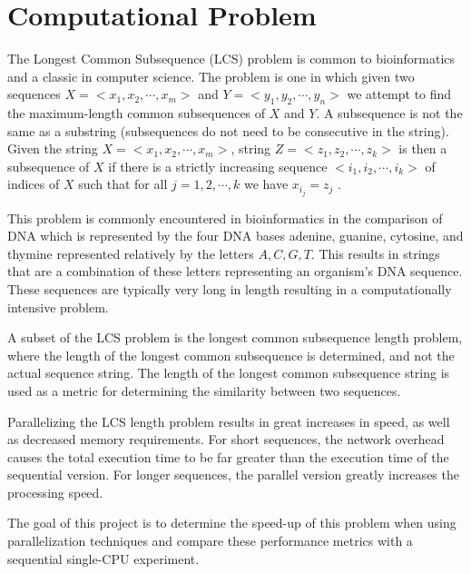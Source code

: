 \section{Computational Problem}
The Longest Common Subsequence (LCS) problem is common to
bioinformatics and a classic in computer science.  The problem is one
in which given two sequences $X=<x_1,x_2,\cdots,x_m>$ and
$Y=<y_1,y_2,\cdots,y_n>$ we attempt to find the maximum-length common
subsequences of $X$ and $Y$. A subsequence is not the same as a
substring (subsequences do not need to be consecutive in the
string). Given the string $X=<x_1,x_2,\cdots,x_m>$, string
$Z=<z_1,z_2,\cdots,z_k>$ is then a subsequence of $X$ if there is a
strictly increasing sequence $<i_1,i_2,\cdots,i_k>$ of indices of $X$
such that for all $j=1,2,\cdots,k$ we have $x_{i_j} = z_j$
\cite{cormen01}.

This problem is commonly encountered in bioinformatics in the
comparison of DNA which is represented by the four DNA bases adenine,
guanine, cytosine, and thymine represented relatively by the letters
${A,C,G,T}$. This results in strings that are a combination of these
letters representing an organism's DNA sequence. These sequences are
typically very long in length resulting in a computationally intensive
problem.

A subset of the LCS problem is the longest common subsequence length
problem, where the length of the longest common subsequence is
determined, and not the actual sequence string. The length of the
longest common subsequence string is used as a metric for determining
the similarity between two sequences.

Parallelizing the LCS length problem results in great increases in
speed, as well as decreased memory requirements. For short sequences,
the network overhead causes the total execution time to be far greater
than the execution time of the sequential version. For longer
sequences, the parallel version greatly increases the processing
speed.

The goal of this project is to determine the speed-up of this problem
when using parallelization techniques and compare these performance
metrics with a sequential single-CPU experiment.
